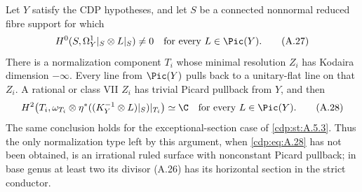 
\begin{proposition}\label{cdp:st:A.5.4}
Let $Y$ satisfy the CDP hypotheses, and let $S$ be a connected nonnormal reduced fibre support for which
\[
 H^0(S,\Omega_Y^1|_S\otimes L|_S)\ne0
 \quad\hbox{for every }L\in\Pic(Y).
 \tag{A.27}\label{cdp:eq:A.27}
\]
There is a normalization component $T_i$ whose minimal resolution $Z_i$ has Kodaira dimension $-\infty$. Every line from $\Pic(Y)$ pulls back to a unitary-flat line on that $Z_i$. A rational or class VII $Z_i$ has trivial Picard pullback from $Y$, and then
\[
 H^2\!\left(T_i,\omega_{T_i}\otimes
             \eta^*((K_Y^{-1}\otimes L)|_S)|_{T_i}\right)\simeq\C
 \quad\hbox{for every }L\in\Pic(Y).
 \tag{A.28}\label{cdp:eq:A.28}
\]
The same conclusion holds for the exceptional-section case of \ref{cdp:st:A.5.3}. Thus the only normalization type left by this argument, when \eqref{cdp:eq:A.28} has not been obtained, is an irrational ruled surface with nonconstant Picard pullback; in base genus at least two its divisor (A.26) has its horizontal section in the strict conductor.
\end{proposition}
